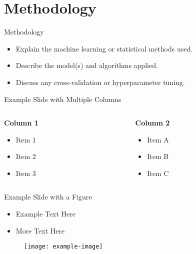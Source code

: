 \documentclass{beamer}
\begin{document}
\section{Methodology}

\begin{frame}{Methodology}
\begin{itemize}
  \item Explain the machine learning or statistical methods used.
  \item Describe the model(s) and algorithms applied.
  \item Discuss any cross-validation or hyperparameter tuning.
\end{itemize}
\end{frame}

\begin{frame}{Example Slide with Multiple Columns}
\begin{columns}[T] %
\begin{column}{0.5\textwidth} %
  \textbf{Column 1}
  \begin{itemize}
    \item Item 1
    \item Item 2
    \item Item 3
  \end{itemize}
\end{column}
\begin{column}{0.5\textwidth} %
  \textbf{Column 2}
  \begin{itemize}
    \item Item A
    \item Item B
    \item Item C
  \end{itemize}
\end{column}
\end{columns}
\end{frame}


\begin{frame}{Example Slide with a Figure}
  \begin{center}
    \begin{itemize}
        \item Example Text Here
        \item More Text Here
    \end{itemize}

    \begin{figure}
      \centering
      \texttt{[image: example-image]} %
    \end{figure}

    \vspace{0.01cm}

  \end{center}
\end{frame}
\end{document}
